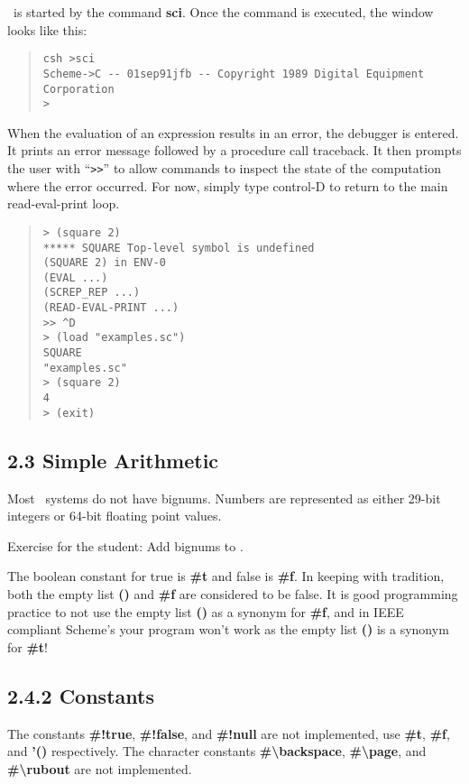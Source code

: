 \documentclass[10pt]{article}
\begin{document}
\StoC\ is started by the command \textbf{sci}.  Once the command
is executed, the window looks like this:

\begin{quote}
\begin{verbatim}
csh >sci
Scheme->C -- 01sep91jfb -- Copyright 1989 Digital Equipment Corporation
>
\end{verbatim}
\end{quote}

When the evaluation of an expression results in an error, the
debugger is entered.  It prints an error message followed by a
procedure call traceback.  It then prompts the user with ``\texttt{>>}''
to allow commands to inspect the state of the computation
where the error occurred.  For now, simply type control-D to
return to the main read-eval-print loop.
\begin{quote}
\begin{verbatim}
> (square 2)
***** SQUARE Top-level symbol is undefined
(SQUARE 2) in ENV-0
(EVAL ...)
(SCREP_REP ...)
(READ-EVAL-PRINT ...)
>> ^D
> (load "examples.sc")
SQUARE
"examples.sc"
> (square 2)
4
> (exit)
\end{verbatim}
\end{quote}

\subsection*{2.3 Simple Arithmetic}

Most \StoC\ systems do not have bignums.  Numbers are
represented as either 29-bit integers or 64-bit floating point
values.

Exercise for the student:  Add bignums to \StoC.

The boolean constant for true is \textbf{\#t} and false is \textbf{\#f}.
In keeping with tradition, both the empty list \textbf{()} and \textbf{\#f}
are considered to be false.  It is good programming practice
to not use the empty list \textbf{()} as a synonym for \textbf{\#f}, and in
IEEE compliant Scheme's your program won't work as the empty
list \textbf{()} is a synonym for \textbf{\#t}!

\subsection*{2.4.2 Constants}

The constants \textbf{\#!true}, \textbf{\#!false}, and \textbf{\#!null} are not implemented,
use \textbf{\#t}, \textbf{\#f}, and \textbf{'()} respectively. The character
constants \textbf{\#\textbackslash{}backspace}, \textbf{\#\textbackslash{}page}, and \textbf{\#\textbackslash{}rubout} are not
implemented.
\end{document}
